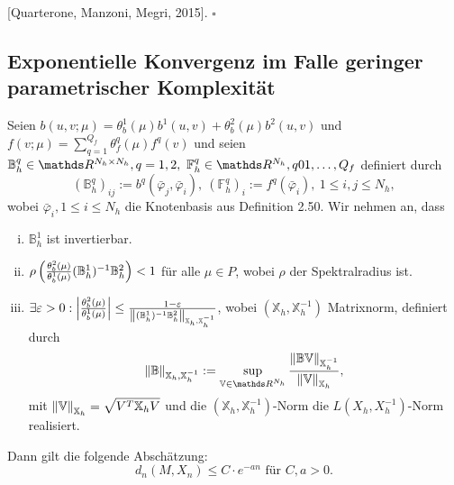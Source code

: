  [Quarterone, Manzoni, Megri, 2015].
\hfill $\square$

\subsection{Exponentielle Konvergenz im Falle geringer parametrischer Komplexität}

Seien $b(u,v;\mu) = \theta_b^1(\mu)b^1(u,v) + \theta_b^2(\mu)b^2(u,v)$ und $f(v;\mu) = \sum_{q=1}^{Q_f} \theta_f^q(\mu)f^q(v)$ und seien $\mathbb{B}_h^q\in \R^{N_h\times N_h},q=1,2,~\mathbb{F}_h^q\in \R^{N_h},q01\dt{,}Q_f$ definiert durch
\[
(\mathbb{B}_h^q)_{ij} := b^q(\bar{\varphi}_j,\bar{\varphi}_i),~(\mathbb{F}_h^q)_i := f^q(\bar{\varphi}_i),~1\le i,j\le N_h,
\]
wobei $\bar{\varphi}_i,1\le i\le N_h$ die Knotenbasis aus Definition 2.50.
Wir nehmen an, dass
\begin{enumerate}[(i)]
	\item $\mathbb{B}_h^1$ ist invertierbar.
	\item $\rho\left( \frac{\theta_b^2(\mu)}{\theta_b^1(\mu)}(\mathbb{B}_h^1)^{-1}\mathbb{B}_h^2\right)<1$ für alle $\mu\in P$, wobei $\rho$ der Spektralradius ist.
	\item $\exists \varepsilon>0: \left\vert\frac{\theta_b^2(\mu)}{\theta_b^1(\mu)}\right\vert \le \frac{1-\varepsilon}{\left\Vert(\mathbb{B}_h^1)^{-1}\mathbb{B}^2_h\right\Vert_{\mathbb{X}_h,\mathbb{X}_h^{-1}}}$, wobei $(\mathbb{X}_h,\mathbb{X}_h^{-1})$ Matrixnorm, definiert durch
	\[
	\norm{\mathbb{B}}_{\mathbb{X}_h,\mathbb{X}_h^{-1}} := \sup\limits_{\mathbb{V}\in \R^{N_h}} \frac{\norm{\mathbb{B}\mathbb{V}}_{\mathbb{X}_h^{-1}}}{\norm{\mathbb{V}}_{\mathbb{X}_h}},	
	\]
	mit $\left\Vert\mathbb{V}\right\Vert_{\mathbb{X}_h}=\sqrt{V^T\mathbb{X}_hV}$ und die $(\mathbb{X}_h,\mathbb{X}_h^{-1})$-Norm die $L(X_h,X_h^{-1})$-Norm realisiert.
\end{enumerate}
Dann gilt die folgende Abschätzung:
\[
d_n(M,X_n) \le C\cdot e^{-an} \text{ für } C,a>0.
\]

